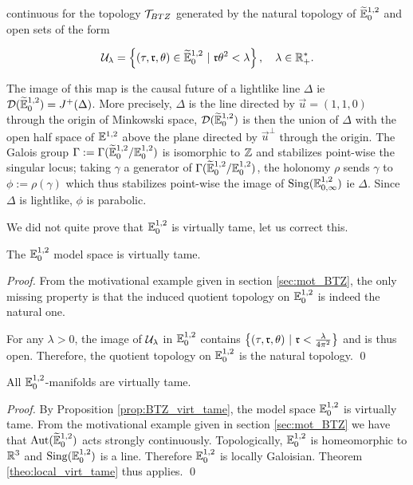 continuous for the topology $\mathcal{T}_{BTZ}$ generated  by the natural topology of ${\widetilde {\mathbb{E}}}^{1,2}_0$ and open sets of the form

$$\mathcal{U}_\lambda = \left\{(\tau,\mathfrak{r},\theta)\in {\widetilde {\mathbb{E}}}^{1,2}_0 ~|~ \mathfrak{r}\theta^2< \lambda  \right\},\quad \lambda \in \mathbb R_+^*.$$


The image of this map is the  causal future of a lightlike line $\Delta$ ie 
$\mathcal{D}({\widetilde {\mathbb{E}}}^{1,2}_0)=J^+(\Delta)$. More precisely, $\Delta$ is the line directed by $
\overrightarrow u = (1,1,0)$ through the origin of Minkowski space, $\mathcal{D}({\widetilde {\mathbb{E}}}^{1,2}_0)$ is then the union of $\Delta$ with the open half space of ${\mathbb E}^{1,2}_{}$ above the plane directed by $\overrightarrow u^\perp$ through the origin.
The Galois group $\Gamma:=\Gamma({\widetilde {\mathbb{E}}}^{1,2}_0/\mathbb{E}^{1,2}_0)$ is isomorphic to $\mathbb{Z}$ and stabilizes point-wise the singular locus; taking $\gamma$ a generator of $\Gamma({\widetilde {\mathbb{E}}}^{1,2}_0/\mathbb{E}^{1,2}_0)$, the holonomy $\rho$ sends $\gamma$ to $\phi:=\rho(\gamma)$ which thus stabilizes point-wise the image of $\mathrm{Sing}({\mathbb E}^{1,2}_{0,\infty})$ ie $\Delta$. Since $\Delta$ is lightlike, $\phi$ is parabolic.

We did not quite prove that $\mathbb{E}^{1,2}_0$ is virtually tame, let us correct this.
\begin{prop}\label{prop:BTZ_virt_tame}The $\mathbb{E}^{1,2}_0$ model space is virtually tame.
 
\end{prop}
\begin{proof} 
 From the motivational example given in section \ref{sec:mot_BTZ}, the only missing property is that the induced quotient topology on $\mathbb{E}^{1,2}_0$ is indeed the natural one. 
 
 For any $\lambda>0$,  the image of $\mathcal{U}_\lambda$ in $\mathbb{E}^{1,2}_0$
contains $\left\{(\tau,\mathfrak{r},\theta)~|~ \mathfrak{r} < \frac{\lambda}{4\pi^2} \right\}$ and is thus open. Therefore, the quotient topology on $\mathbb{E}^{1,2}_0$ is the natural topology.
\qed\end{proof}

\begin{prop} \label{prop:BTZ_manifold_virt_tame} All $\mathbb{E}^{1,2}_0$-manifolds are virtually tame.
\end{prop}
\begin{proof}
 By Proposition \ref{prop:BTZ_virt_tame}, the model space $\mathbb{E}^{1,2}_0$ is virtually tame. From the motivational example given in section \ref{sec:mot_BTZ} we have that $\mathrm{Aut}({\widetilde {\mathbb{E}}}^{1,2}_0)$ acts strongly continuously. Topologically, $\mathbb{E}^{1,2}_0$ is homeomorphic to $\mathbb R^{3}$ and $\mathrm{Sing}(\mathbb{E}^{1,2}_0)$ is a line. Therefore $\mathbb{E}^{1,2}_0$ is locally Galoisian. Theorem \ref{theo:local_virt_tame} thus applies.
\qed\end{proof}



